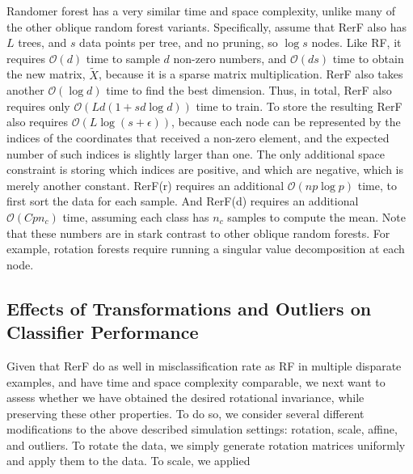 \documentclass{article} %
\providecommand{\mc}[1]{\mathcal{#1}}
\providecommand{\mt}[1]{\widetilde{#1}}
\begin{document}
Randomer forest has a very similar time and space complexity, unlike many of the other oblique random forest variants.  Specifically, assume that RerF also has $L$ trees, and $s$ data points per tree, and no pruning, so $\log s$ nodes. Like RF, it requires $\mc{O}(d)$ time to sample $d$ non-zero numbers, and $\mc{O}(ds)$ time to obtain the new matrix, $\mt{X}$, because it is a sparse matrix multiplication.  RerF also takes another $\mc{O}(\log d)$ time to find the best dimension.  Thus, in total, RerF also requires only $\mc{O}(Ld  (1 + s d \log d))$ time to train.  To store the resulting RerF also requires $\mc{O}(L \log(s+\epsilon))$, because each node can be represented by the indices of the coordinates that received a non-zero element, and the expected number of such indices is slightly larger than one.  The only additional space constraint is storing which indices are positive, and which are negative, which is merely another constant.
RerF(r) requires an additional $\mc{O}(np \log p)$ time, to first sort the data for each sample. And RerF(d) requires an additional $\mc{O}(C  p n_c)$ time, assuming each class has $n_c$ samples to compute the mean.  Note that these numbers are in stark contrast to other oblique random forests.  For example, rotation forests require running a singular value decomposition at each node.



\subsection{Effects of Transformations and Outliers on Classifier Performance}

Given that RerF do as well in misclassification rate as RF in multiple disparate examples, and have time and space complexity comparable, we next want to assess whether we have obtained the desired rotational invariance, while preserving these other properties.  To do so, we consider several different modifications to the above described simulation settings: rotation, scale, affine, and outliers.  To rotate the data, we simply generate rotation matrices uniformly and apply them to the data.  To scale, we applied 
\end{document}
